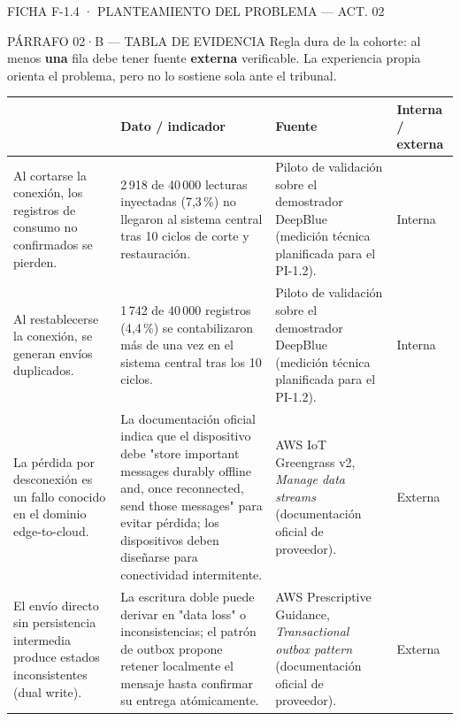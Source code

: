 \documentclass[11pt,a4paper]{article}
\newcommand{\tblhead}{\rowcolor{gris800}}
\begin{document}
\begin{seccion}{\faBook}{FICHA F-1.4 · PLANTEAMIENTO DEL PROBLEMA --- ACT. 02}
\begin{seccion}{\faTable}{PÁRRAFO 02·B --- TABLA DE EVIDENCIA}
{\small
Regla dura de la cohorte: al menos \textbf{una} fila debe tener fuente \textbf{externa} verificable. La experiencia propia orienta el problema, pero no lo sostiene sola ante el tribunal.
}
\vspace{4pt}
\renewcommand{\arraystretch}{1.3}
\begin{tabularx}{\linewidth}{p{4.4cm} X p{4.6cm} p{1.5cm}}
  \toprule
  \tblhead {\color{white}\bfseries Afirmación que hacés} & {\color{white}\bfseries Dato / indicador} & {\color{white}\bfseries Fuente} & {\color{white}\bfseries Interna / externa} \\
  \midrule
  Al cortarse la conexión, los registros de consumo no confirmados se pierden. & 2\,918 de 40\,000 lecturas inyectadas (7,3\,\%) no llegaron al sistema central tras 10 ciclos de corte y restauración. & Piloto de validación sobre el demostrador DeepBlue (medición técnica planificada para el PI-1.2). & Interna \\
  Al restablecerse la conexión, se generan envíos duplicados. & 1\,742 de 40\,000 registros (4,4\,\%) se contabilizaron más de una vez en el sistema central tras los 10 ciclos. & Piloto de validación sobre el demostrador DeepBlue (medición técnica planificada para el PI-1.2). & Interna \\
  La pérdida por desconexión es un fallo conocido en el dominio edge-to-cloud. & La documentación oficial indica que el dispositivo debe "store important messages durably offline and, once reconnected, send those messages" para evitar pérdida; los dispositivos deben diseñarse para conectividad intermitente. & AWS IoT Greengrass v2, \emph{Manage data streams} (documentación oficial de proveedor). & Externa \\
  El envío directo sin persistencia intermedia produce estados inconsistentes (dual write). & La escritura doble puede derivar en "data loss" o inconsistencias; el patrón de outbox propone retener localmente el mensaje hasta confirmar su entrega atómicamente. & AWS Prescriptive Guidance, \emph{Transactional outbox pattern} (documentación oficial de proveedor). & Externa \\
  \bottomrule
\end{tabularx}
\end{seccion}


\end{seccion}
\end{document}
